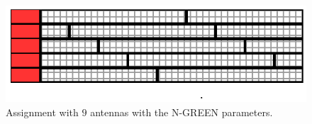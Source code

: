 \documentclass[10pt, conference, letterpaper]{IEEEtran}
\begin{document}
\begin{figure}[h!]
\begin{center}   

      \includegraphics[scale=0.8]{split}
     \caption{Assignment with $9$ antennas with the N-GREEN parameters.}   \label{fig:split}
\end{center}
  \end{figure}
  

  
  

\end{document}

